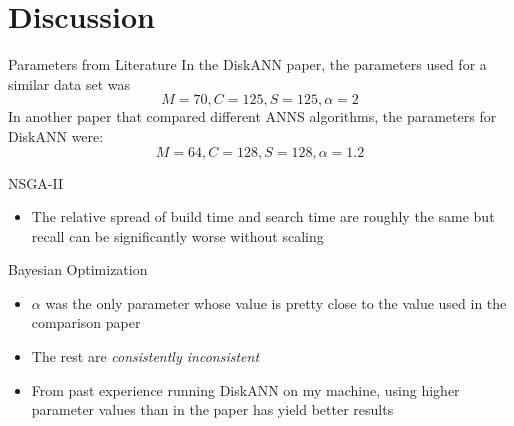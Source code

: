 \section{Discussion}

\begin{frame}{Parameters from Literature}
    In the DiskANN paper, the parameters used for a similar data set was
    \[
        M=70, C=125, S=125, \alpha=2
    \]
    In another paper that compared different ANNS algorithms, the parameters for DiskANN were:
    \[
        M=64, C=128, S=128, \alpha=1.2
    \]
\end{frame}

\begin{frame}{NSGA-II}
    \begin{itemize}
        \item The relative spread of build time and search time are roughly the same but recall can be significantly worse without scaling
    \end{itemize}
\end{frame}

\begin{frame}{Bayesian Optimization}
    \begin{itemize}
        \item \(\alpha\) was the only parameter whose value is pretty close to the value used in the comparison paper
        \item The rest are \textit{consistently inconsistent}
        \item From past experience running DiskANN on my machine, using higher parameter values than in the paper has yield better results
    \end{itemize}
\end{frame}

